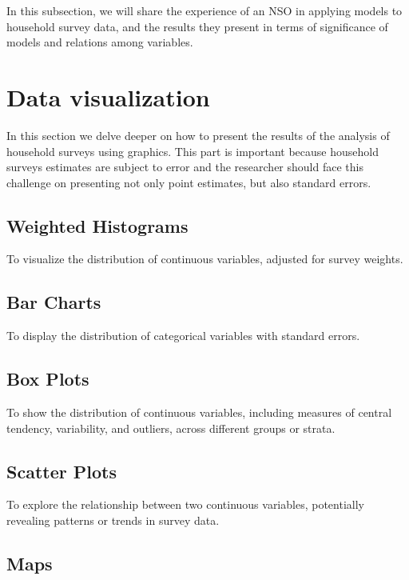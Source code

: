 \documentclass[
  12pt,
]{book}
\begin{document}
In this subsection, we will share the experience of an NSO in applying models to household survey data, and the results they present in terms of significance of models and relations among variables.

\hypertarget{data-visualization}{%
\chapter{Data visualization}\label{data-visualization}}

In this section we delve deeper on how to present the results of the analysis of household surveys using graphics. This part is important because household surveys estimates are subject to error and the researcher should face this challenge on presenting not only point estimates, but also standard errors.

\hypertarget{weighted-histograms}{%
\section{Weighted Histograms}\label{weighted-histograms}}

To visualize the distribution of continuous variables, adjusted for survey weights.

\hypertarget{bar-charts}{%
\section{Bar Charts}\label{bar-charts}}

To display the distribution of categorical variables with standard errors.

\hypertarget{box-plots}{%
\section{Box Plots}\label{box-plots}}

To show the distribution of continuous variables, including measures of central tendency, variability, and outliers, across different groups or strata.

\hypertarget{scatter-plots}{%
\section{Scatter Plots}\label{scatter-plots}}

To explore the relationship between two continuous variables, potentially revealing patterns or trends in survey data.

\hypertarget{maps}{%
\section{Maps}\label{maps}}
\end{document}
